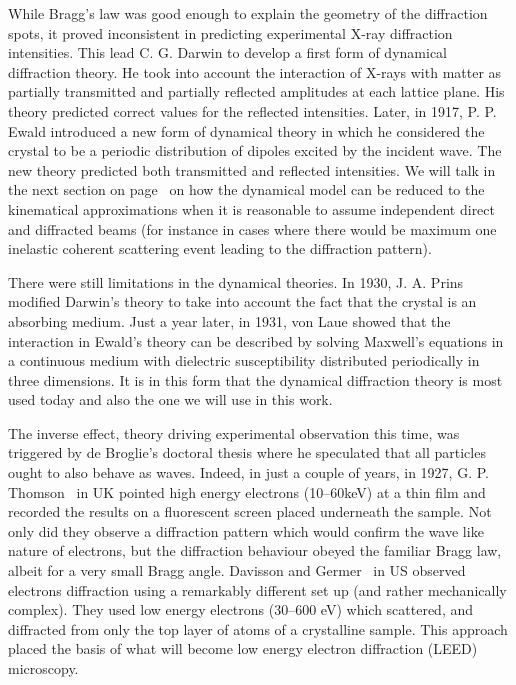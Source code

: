 While Bragg's law was good enough to explain the geometry of the diffraction spots, it proved inconsistent in predicting experimental X-ray diffraction intensities. This lead C. G. Darwin to develop a first form of dynamical diffraction theory. He took into account the interaction of X-rays with matter as partially transmitted and partially reflected amplitudes at each lattice plane. His theory predicted correct values for the reflected intensities. Later, in 1917, P. P. Ewald introduced a new form of dynamical theory in which he considered the crystal to be a periodic distribution of dipoles excited by the incident wave. The new theory predicted both transmitted and reflected intensities. We will talk in the next section on page~\pageref{sec:kinvsDyn} on how the dynamical model can be reduced to the kinematical approximations when it is reasonable to assume independent direct and diffracted beams (for instance in cases where there would be maximum one inelastic coherent scattering event leading to the diffraction pattern).

There were still limitations in the dynamical theories. In 1930, J. A. Prins~\cite{Prins30} modified Darwin's theory to take into account the fact that the crystal is an absorbing medium. Just a year later, in 1931, von Laue showed that the interaction in Ewald's theory can be described by solving Maxwell's equations in a continuous medium with dielectric susceptibility distributed periodically in three dimensions. It is in this form that the dynamical diffraction theory is most used today and also the one we will use in this work.
  
The inverse effect, theory driving experimental observation this time, was triggered by de Broglie's doctoral thesis where he speculated that all particles ought to also behave as waves. Indeed, in just a couple of years, in 1927, G. P. Thomson~\cite{Thomson27} in UK pointed high energy electrons (10--60\si{\keV}) at a thin film and recorded the results on a fluorescent screen placed underneath the sample. Not only did they observe a diffraction pattern which would confirm the wave like nature of electrons, but the diffraction behaviour obeyed the familiar Bragg law, albeit for a very small Bragg angle. Davisson and Germer~\cite{Davisson27} in US observed electrons diffraction using a remarkably different set up (and rather mechanically complex). They used low energy electrons (30--600 \si{\eV}) which scattered, and diffracted from only the top layer of atoms of a crystalline sample. This approach placed the basis of what will become low energy electron diffraction (LEED) microscopy.  


